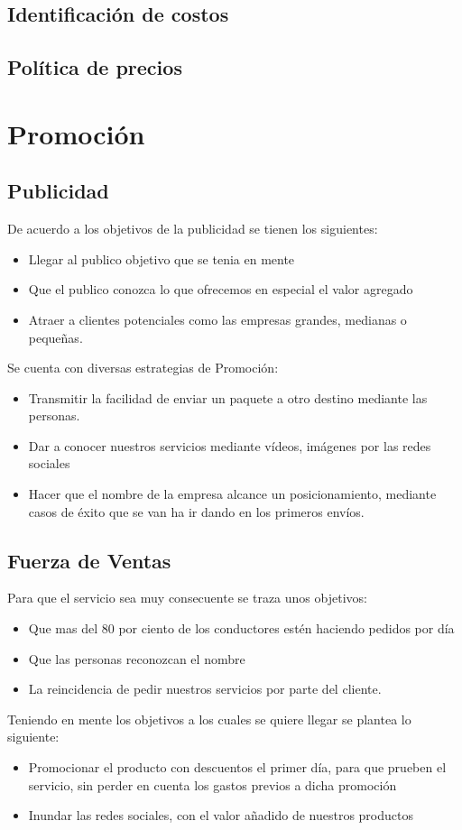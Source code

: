 \subsection{Identificación de costos}

\subsection{Política de precios}

\section{Promoción}
\subsection{Publicidad}
De acuerdo a los objetivos de la publicidad se tienen los siguientes:
\begin{itemize}
\item Llegar al publico objetivo que se tenia en mente 
\item Que el publico conozca lo que ofrecemos en especial el valor agregado
\item Atraer a clientes potenciales como las empresas grandes, medianas o pequeñas.
\end{itemize}
Se cuenta con diversas estrategias de Promoción:
\begin{itemize}
\item Transmitir la facilidad de enviar un paquete a otro destino mediante las personas.
\item Dar a conocer nuestros servicios mediante vídeos, imágenes por las redes sociales
\item Hacer que el nombre de la empresa alcance un posicionamiento, mediante casos de éxito que se van ha ir dando en los primeros envíos.

\end{itemize}
\subsection{Fuerza de Ventas}
Para que el servicio sea muy consecuente se traza unos objetivos:
\begin{itemize}
\item Que mas del 80 por ciento de los conductores estén haciendo pedidos por día 
\item Que las personas reconozcan el nombre 
\item La reincidencia de pedir nuestros servicios por parte del cliente.
\end{itemize}
Teniendo en mente los objetivos a los cuales se quiere llegar se plantea lo siguiente:
\begin{itemize}
\item Promocionar el producto con descuentos el primer día, para que prueben el servicio, sin perder en cuenta los gastos previos a dicha promoción
\item Inundar las redes sociales, con el valor añadido de nuestros productos
\end{itemize}
